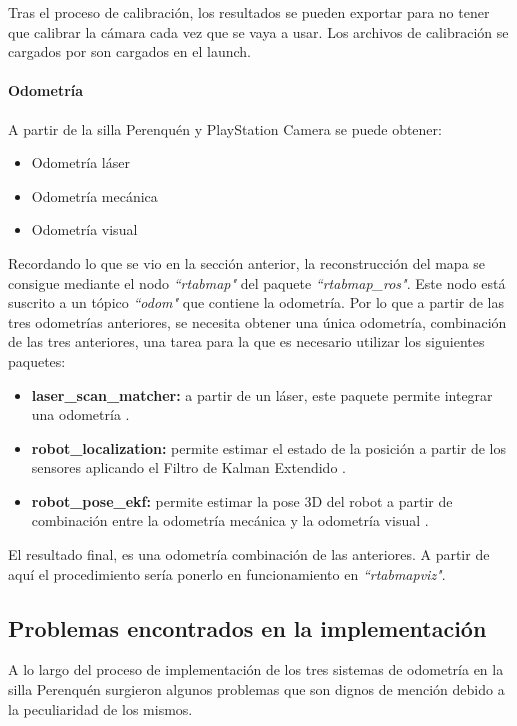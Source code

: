 Tras el proceso de calibración, los resultados se pueden exportar para no tener
que calibrar la cámara cada vez que se vaya a usar. Los archivos de calibración
se cargados por son cargados en el launch.

\paragraph{Odometría} \hspace{0pt}

A partir de la silla Perenquén y PlayStation Camera se puede obtener:

\begin{itemize}
  \item Odometría láser
  \item Odometría mecánica
  \item Odometría visual
\end{itemize}

Recordando lo que se vio en la sección anterior, la reconstrucción del mapa se
consigue mediante el nodo \textit{``rtabmap"} del paquete
\textit{``rtabmap\_ros"}. Este nodo está suscrito a un tópico \textit{``odom"}
que contiene la odometría. Por lo que a partir de las tres odometrías
anteriores, se necesita obtener una única odometría, combinación de las tres
anteriores, una tarea para la que es necesario utilizar los siguientes paquetes:

\begin{itemize}
  \item \textbf{laser\_scan\_matcher:} a partir de un láser, este paquete
  permite integrar una odometría \cite{PackageScanMatcher}.
  \item \textbf{robot\_localization:} permite estimar el estado de la posición a
  partir de los sensores aplicando el Filtro de Kalman Extendido
  \cite{PackageLocalization}.
  \item \textbf{robot\_pose\_ekf:} permite estimar la pose 3D del robot a partir
  de combinación entre la odometría mecánica y la odometría visual
  \cite{PackagePoseEkf}.
\end{itemize}

El resultado final, es una odometría combinación de las anteriores. A partir de
aquí el procedimiento sería ponerlo en funcionamiento en \textit{``rtabmapviz"}.

\subsection{Problemas encontrados en la implementación}
A lo largo del proceso de implementación de los tres sistemas de odometría en la
silla Perenquén surgieron algunos problemas que son dignos de mención debido a
la peculiaridad de los mismos.

